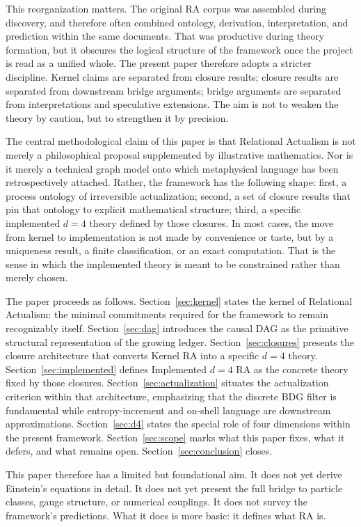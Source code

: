 \documentclass[11pt]{article}
\begin{document}
This reorganization matters. The original RA corpus was assembled during discovery, and therefore often combined ontology, derivation, interpretation, and prediction within the same documents. That was productive during theory formation, but it obscures the logical structure of the framework once the project is read as a unified whole. The present paper therefore adopts a stricter discipline. Kernel claims are separated from closure results; closure results are separated from downstream bridge arguments; bridge arguments are separated from interpretations and speculative extensions. The aim is not to weaken the theory by caution, but to strengthen it by precision.

The central methodological claim of this paper is that Relational Actualism is not merely a philosophical proposal supplemented by illustrative mathematics. Nor is it merely a technical graph model onto which metaphysical language has been retrospectively attached. Rather, the framework has the following shape: first, a process ontology of irreversible actualization; second, a set of closure results that pin that ontology to explicit mathematical structure; third, a specific implemented $d=4$ theory defined by those closures. In most cases, the move from kernel to implementation is not made by convenience or taste, but by a uniqueness result, a finite classification, or an exact computation. That is the sense in which the implemented theory is meant to be constrained rather than merely chosen.

The paper proceeds as follows. Section~\ref{sec:kernel} states the kernel of Relational Actualism: the minimal commitments required for the framework to remain recognizably itself. Section~\ref{sec:dag} introduces the causal DAG as the primitive structural representation of the growing ledger. Section~\ref{sec:closures} presents the closure architecture that converts Kernel RA into a specific $d=4$ theory. Section~\ref{sec:implemented} defines Implemented $d=4$ RA as the concrete theory fixed by those closures. Section~\ref{sec:actualization} situates the actualization criterion within that architecture, emphasizing that the discrete BDG filter is fundamental while entropy-increment and on-shell language are downstream approximations. Section~\ref{sec:d4} states the special role of four dimensions within the present framework. Section~\ref{sec:scope} marks what this paper fixes, what it defers, and what remains open. Section~\ref{sec:conclusion} closes.

This paper therefore has a limited but foundational aim. It does not yet derive Einstein's equations in detail. It does not yet present the full bridge to particle classes, gauge structure, or numerical couplings. It does not survey the framework's predictions. What it does is more basic: it defines what RA is.
\end{document}
